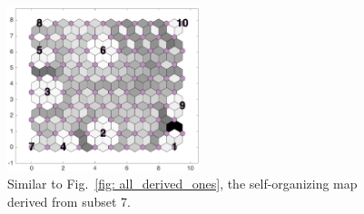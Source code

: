 \begin{figure}
        \centering
        \includegraphics[width=0.5\textwidth]{../../images0.01/M31/2D/image_subsets/subset7_dist_with_hits_t.png}
    \caption{Similar to Fig.~\ref{fig: all_derived_ones}, the self-organizing map derived  from subset 7.}
    \label{fig: subset7}
\end{figure}
